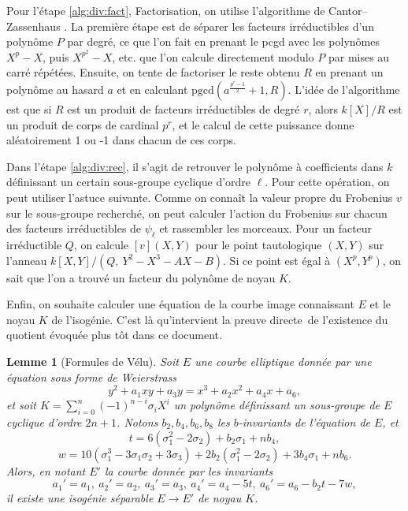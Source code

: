 \documentclass[11pt,a4paper]{article}
\newcommand{\vers}{\longrightarrow}
\renewcommand{\frak}{\mathfrak}
\renewcommand{\mod}{\ \mathrm{mod}\ }
\renewcommand{\v}{\vspace{5mm}}
\newtheorem*{lem}{Lemme}
\theoremstyle{definition}
\begin{document}
Pour l'étape \ref{alg:div:fact}, {\sc Factorisation}, on utilise l'algorithme de Cantor--Zassenhaus \cite{vzGG}. La première étape est de séparer les facteurs irréductibles d'un polynôme $P$ par degré, ce que l'on fait en prenant le pcgd avec les polynômes $X^p - X$, puis $X^{p^2} - X$, etc. que l'on calcule directement modulo $P$ par mises au carré répétées. Ensuite, on tente de factoriser le reste obtenu $R$ en prenant un polynôme au hasard $a$ et en calculant $\mathrm{pgcd}(a^{\frac{p^r - 1}{2}} + 1, R)$. L'idée de l'algorithme est que si $R$ est un produit de facteurs irréductibles de degré $r$, alors $k[X]/R$ est un produit de corps de cardinal $p^r$, et le calcul de cette puissance donne aléatoirement 1 ou -1 dans chacun de ces corps.
\v

Dans l'étape \ref{alg:div:rec}, il s'agit de retrouver le polynôme à coefficients dans $k$ définissant un certain sous-groupe cyclique d'ordre $\ell$. Pour cette opération, on peut utiliser l'astuce suivante. Comme on connaît la valeur propre du Frobenius $v$ sur le sous-groupe recherché, on peut calculer l'action du Frobenius sur chacun des facteurs irréductibles de $\psi_\ell$ et rassembler les morceaux. Pour un facteur irréductible $Q$, on calcule $[v](X, Y)$ pour le point tautologique $(X, Y)$ sur l'anneau $k[X, Y]/(Q,\ Y^2 - X^3 - AX - B).$ Si ce point est égal à $(X^p, Y^p)$, on sait que l'on a trouvé un facteur du polynôme de noyau $K$.
\v
%

Enfin, on souhaite calculer une équation de la courbe image connaissant $E$ et le noyau $K$ de l'isogénie. C'est là qu'intervient la preuve \og directe\fg\ de l'existence du quotient évoquée plus tôt dans ce document.

\begin{lem}[Formules de Vélu]
Soit $E$ une courbe elliptique donnée par une équation sous forme de Weierstrass
$$y^2 + a_1 x y + a_3 y = x^3 + a_2 x^2 + a_4 x + a_6,$$
et soit $K = \sum_{i=0}^n (-1)^{n-i} \sigma_i X^i$ un polynôme définissant un sous-groupe de $E$ cyclique d'ordre $2n+1$. Notons $b_2, b_4, b_6, b_8$ les $b$-invariants de l'équation de $E$, et 
$$ t = 6(\sigma_1^2 - 2 \sigma_2) + b_2 \sigma_1 + n b_4,$$
$$ w = 10 (\sigma_1^3 - 3 \sigma_1 \sigma_2 + 3 \sigma_3) + 2  b_2 (\sigma_1^2 - 2 \sigma_2) + 3 b_4 \sigma_1 + n b_6.$$
Alors, en notant $E'$ la courbe donnée par les invariants
$$ a_1' = a_1,\ a_2' = a_2,\ a_3' = a_3,\ a_4' = a_4 - 5 t,\ a_6' = a_6 - b_2 t - 7 w,$$
il existe une isogénie séparable $E\vers E'$ de noyau $K$.
\end{lem}
\end{document}
